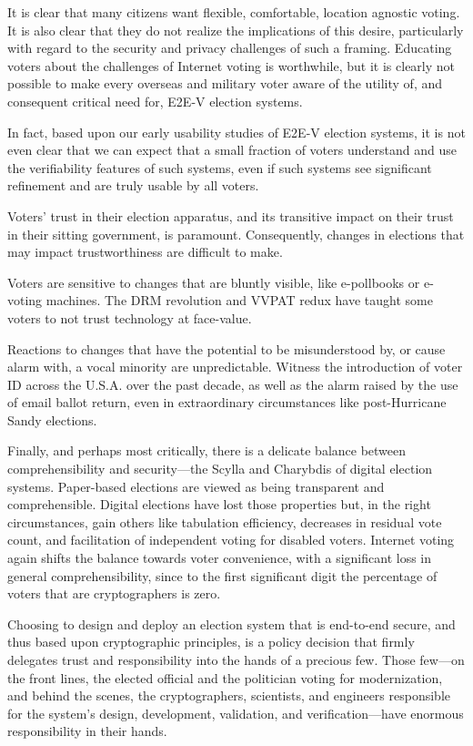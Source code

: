 It is clear that many citizens want flexible, comfortable, location
agnostic voting.  It is also clear that they do not realize the
implications of this desire, particularly with regard to the security
and privacy challenges of such a framing.  Educating voters about the
challenges of Internet voting is worthwhile, but it is clearly not
possible to make every overseas and military voter aware of the utility 
of, and consequent critical need for, E2E-V election systems.

In fact, based upon our early usability studies of E2E-V election
systems, it is not even clear that we can expect that a small fraction
of voters understand and use the verifiability features of such
systems, even if such systems see significant refinement and are
truly usable by all voters.

Voters' trust in their election apparatus, and its transitive impact on
their trust in their sitting government, is paramount. Consequently,
changes in elections that may impact trustworthiness are difficult to
make.

Voters are sensitive to changes that are bluntly visible, like
e-pollbooks or e-voting machines. The DRM revolution and VVPAT redux
have taught some voters to not trust technology at face-value.

Reactions to changes that have the potential to be misunderstood by,
or cause alarm with, a vocal minority are unpredictable. Witness the
introduction of voter ID across the U.S.A. over the past decade, as
well as the alarm raised by the use of email ballot return, even in
extraordinary circumstances like post-Hurricane Sandy elections.

Finally, and perhaps most critically, there is a delicate balance
between comprehensibility and security---the Scylla and Charybdis of
digital election systems. Paper-based elections are viewed as being
transparent and comprehensible. Digital elections have lost those
properties but, in the right circumstances, gain others like
tabulation efficiency, decreases in residual vote count, and
facilitation of independent voting for disabled voters. Internet
voting again shifts the balance towards voter convenience, with a
significant loss in general comprehensibility, since to the first
significant digit the percentage of voters that are cryptographers is
zero.

Choosing to design and deploy an election system that is end-to-end
secure, and thus based upon cryptographic principles, is a policy
decision that firmly delegates trust and responsibility into the hands
of a precious few.  Those few---on the front lines, the elected official
and the politician voting for modernization, and behind the scenes,
the cryptographers, scientists, and engineers responsible for the
system's design, development, validation, and verification---have
enormous responsibility in their hands.

